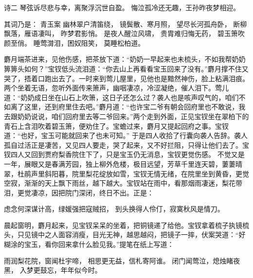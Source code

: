 \documentclass[12pt,oneside]{book}
\begin{document}
诗二 
琴弦诉尽悲与幸，离聚浮沉世自盈。
悔泣孤冷还无趣，王孙昨夜梦相迎。 

其词乃是： 
青玉案 
幽林翠户清笛绕，
镜鬓散、寒月照，
望尽长河孤舟卧，
断柳飘落，雁语凄叫，
昨梦君影悄。
是夜人醒泣风啸，
贵胄难归悔无药，
碧玉箫吹颜至俏。
睡莺潸泪，困奴阻笑，
莫睡松柏道。

麝月端茶进来，见他伤感，把茶放下道：“奶奶一早起来也未梳头，不如我帮奶奶箅箅头如何？”宝钗低头流泪道：“你去山上再看看宝玉回来了没有。”麝月撑不住又哭了，捂着口跑出去了。一时来到莺儿屋里，见他也是黯然神伤，脸上粘满泪痕。两个坐着无语，忽听外面传来箫声，幽咽凄凉，冷涩凝绝，催人泪下。莺儿道：“奶奶成日坐在山石上吹箫，这日子还怎么过？袭人也是咳声叹气的，咱们不如离了这里，还到府里住去吧。”麝月道：“也许宝二爷有朝会回府里也不敢说，我去跟奶奶说说，咱们回府里去等二爷回来。”两个走到外面，正见宝钗坐在翠柏下的青石上含泪吹着碧玉箫，便劝住了。宝蟾过来，麝月又提起回府之事。宝钗道：“也好，宝玉可能就回来了也未可知。”
于是四人收拾了行囊向袭人告辞。袭人孤自过活正是凄苦，又见四人要走，哭了起来，又不好拦阻，只得让他们去了。宝钗四人又回到贾府梨香院住下了，只是宝玉仍无消息，宝钗更觉伤感。
不觉又是一年，展眼又是春满芳园，独上柳外危楼，极目远望，芳草千里连天碧，萋萋晴翠，杜鹃声里斜阳暮，院里梨花绽放如雪，宝钗无情无绪，在院里坐到黄昏，更觉空寂，渐渐的天上飘下雨丝，越下越大。宝钗站在雨中，看那烟雨凄迷，梨花带泪，更觉凄凉，因把院门深闭，终日不出。正是：

虑念何深谋计高，绿媛强把寇贼招，
到头换得人伶仃，寂寞秋风是情刀。

晨起窗明，麝月起来，见宝钗呆呆的坐着，把铜镜递了给他。宝钗拿着梳子执镜梳头，只见镜中之人面容消瘦，目光无神，越思越闷，把镜子一摔，伏案哭道：“好糊涂的宝玉，看你回来拿什么脸见我。”提笔在纸上写道：

雨润梨花院，窗闻杜宇啼，
相思更无益，信札寄阿谁。
闭门闻莺泣，熄烛睹夜黑，
入梦更鼓忘，年年似今时。
\end{document}
